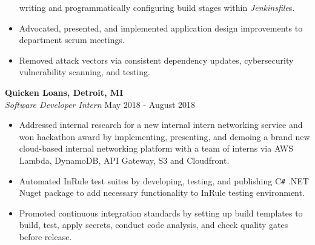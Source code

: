 \documentclass[overlapped]{res}
\begin{document}
\begin{resume}
\begin{itemize}
    writing and programmatically configuring build stages within {\it Jenkinsfile}s.
    \item Advocated, presented, and implemented application design improvements to department scrum meetings.
    \item Removed attack vectors via consistent dependency updates, cybersecurity vulnerability scanning, and testing.
\end{itemize}

\textbf{Quicken Loans, Detroit, MI} \\
{\sl Software Developer Intern}  \hfill May 2018 - August 2018
\begin{itemize}  \itemsep -2pt %

    \item Addressed internal research for a new internal intern networking service
    and won hackathon award
    by implementing, presenting, and demoing 
    a brand new cloud-based internal
    networking platform with a team of interns via
    AWS Lambda, DynamoDB, API Gateway, S3 and Cloudfront.

    \item Automated InRule test suites by developing, testing, and publishing 
    C\texttt{\#} .NET Nuget package to add
    necessary functionality to InRule testing environment.

    \item Promoted continuous integration standards by setting up build templates to build,
    test, apply secrets, conduct code analysis,
    and check quality gates before release.





\end{itemize}
\end{resume}
\end{document}
